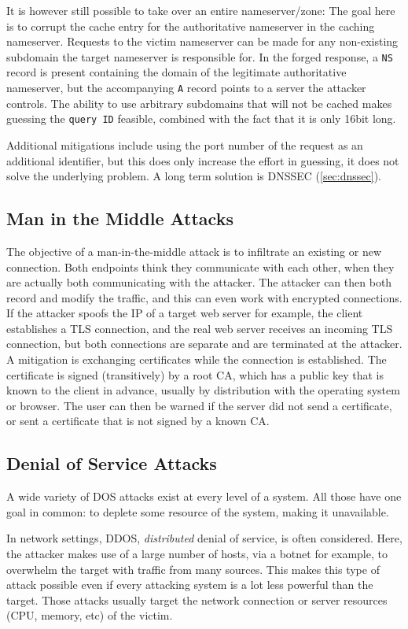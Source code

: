 It is however still possible to take over an entire nameserver/zone: The goal
here is to corrupt the cache entry for the authoritative nameserver in the
caching nameserver. Requests to the victim nameserver can be made for any
non-existing subdomain the target nameserver is responsible for. In the forged
response, a \texttt{NS} record is present containing the domain of the
legitimate authoritative nameserver, but the accompanying \texttt{A} record
points to a server the attacker controls. The ability to use arbitrary
subdomains that will not be cached makes guessing the \texttt{query ID}
feasible, combined with the fact that it is only 16bit long.

Additional mitigations include using the port number of the request as an
additional identifier, but this does only increase the effort in guessing, it
does not solve the underlying problem. A long term solution is DNSSEC
(\cref{sec:dnssec}).


\subsection{Man in the Middle Attacks}
The objective of a man-in-the-middle attack is to infiltrate an existing or new
connection. Both endpoints think they communicate with each other, when they are
actually both communicating with the attacker. The attacker can then both record
and modify the traffic, and this can even work with encrypted connections. If
the attacker spoofs the IP of a target web server for example, the client
establishes a TLS connection, and the real web server receives an incoming TLS
connection, but both connections are separate and are terminated at the
attacker. A mitigation is exchanging certificates while the connection is
established. The certificate is signed (transitively) by a root CA, which has a
public key that is known to the client in advance, usually by distribution with
the operating system or browser. The user can then be warned if the server did
not send a certificate, or sent a certificate that is not signed by a known CA.

\subsection{Denial of Service Attacks}
A wide variety of DOS attacks exist at every level of a system. All those have
one goal in common: to deplete some resource of the system, making it
unavailable.

In network settings, DDOS, \textit{distributed} denial of service, is often
considered. Here, the attacker makes use of a large number of hosts, via a
botnet for example, to overwhelm the target with traffic from many sources. This
makes this type of attack possible even if every attacking system is a lot less
powerful than the target. Those attacks usually target the network connection or
server resources (CPU, memory, etc) of the victim.

